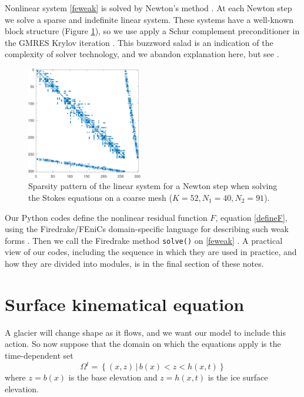 \documentclass[letterpaper,final,12pt,reqno]{amsart}
\begin{document}
Nonlinear system \eqref{feweak} is solved by Newton's method \cite{Bueler2021,Kelley2003}.  At each Newton step we solve a sparse and indefinite linear system.  These systems have a well-known block structure (Figure \ref{fig:lowspy}), so we use apply a Schur complement preconditioner in the GMRES Krylov iteration \cite{Elmanetal2014,GolubVanLoan2013}.  This buzzword salad is an indication of the complexity of solver technology, and we abandon explanation here, but see \cite[Chapter 14]{Bueler2021}.

\begin{figure}[h]
\includegraphics[width=0.45\textwidth]{lowspy}
\caption{Sparsity pattern of the linear system for a Newton step when solving the Stokes equations on a coarse mesh ($K=52,N_1=40,N_2=91$).}
\label{fig:lowspy}
\end{figure}

Our Python codes define the nonlinear residual function $F$, equation \eqref{defineF}, using the Firedrake/FEniCs domain-specific language for describing such weak forms \cite{Alnaesetal2014}.  Then we call the Firedrake method \texttt{solve()} on \eqref{feweak} \cite{Rathgeberetal2016}.  A practical view of our codes, including the sequence in which they are used in practice, and how they are divided into modules, is in the final section of these notes.


\section{Surface kinematical equation} \label{sec:kinematical}

A glacier will change shape as it flows, and we want our model to include this action.  So now suppose that the domain on which the equations apply is the time-dependent set
\begin{equation}
\Omega^t = \left\{(x,z)\,\big|\, b(x) < z < h(x,t)\right\}  \label{Omegat}
\end{equation}
where $z=b(x)$ is the base elevation and $z=h(x,t)$ is the ice surface elevation.
\end{document}
